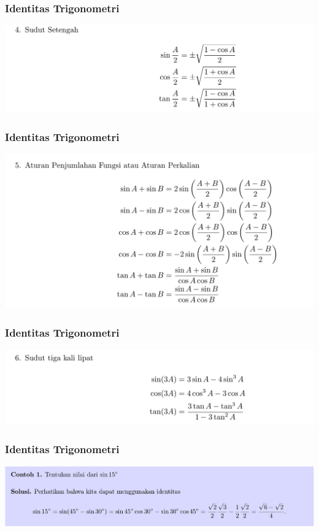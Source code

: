\documentclass[pdflatex,compress,mathserif]{beamer}
\begin{document}
\begin{frame}
	\frametitle{Identitas Trigonometri}
	\begin{center}
		\includegraphics[width=\linewidth]{img/img12}
	\end{center}
\end{frame}

\begin{frame}
	\frametitle{Identitas Trigonometri}
	\begin{center}
		\includegraphics[width=\linewidth]{img/img13}
	\end{center}
\end{frame}

\begin{frame}
	\frametitle{Identitas Trigonometri}
	\begin{center}
		\includegraphics[width=\linewidth]{img/img14}
	\end{center}
\end{frame}

\begin{frame}
	\frametitle{Identitas Trigonometri}
	\begin{center}
		\includegraphics[width=\linewidth]{img/img15}
	\end{center}
\end{frame}
\end{document}
